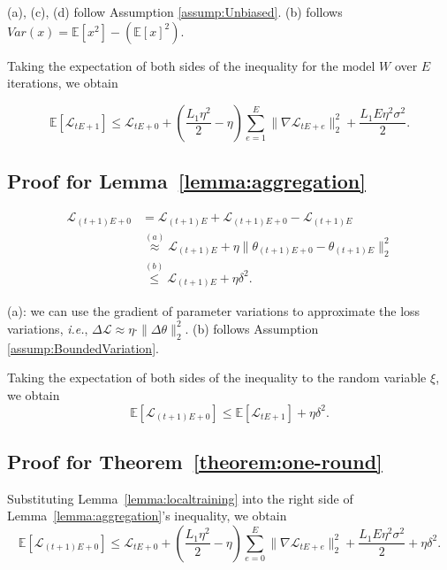 \documentclass[sigconf]{acmart}
\newcommand{\assum}{Assumption }
\begin{document}
(a), (c), (d) follow \assum \ref{assump:Unbiased}. (b) follows $Var(x)=\mathbb{E}[x^2]-(\mathbb{E}[x]^2)$. 


Taking the expectation of both sides of the inequality for the model $W$ over $E$ iterations, we obtain

\begin{equation}
\mathbb{E}[\mathcal{L}_{t E+1}] \leq \mathcal{L}_{t E+0}+(\frac{L_1 \eta^2}{2}-\eta) \sum_{e=1}^E\|\nabla \mathcal{L}_{t E+e}\|_2^2+\frac{L_1 E \eta^2 \sigma^2}{2} . 
\end{equation}

\subsection{Proof for Lemma~\ref{lemma:aggregation}}
\begin{equation}
\begin{aligned}
\mathcal{L}_{(t+1) E+0}& =\mathcal{L}_{(t+1) E}+\mathcal{L}_{(t+1) E+0}-\mathcal{L}_{(t+1) E} \\
& \stackrel{(a)}{\approx} \mathcal{L}_{(t+1) E}+\eta\|\theta_{(t+1) E+0}-\theta_{(t+1) E}\|_2^2 \\
& \stackrel{(b)}{\leq} \mathcal{L}_{(t+1) E}+\eta \delta^2.
\end{aligned}
\end{equation}

(a): we can use the gradient of parameter variations to approximate the loss variations, \emph{i.e.}, $\Delta\mathcal{L}\approx \eta\cdot \|\Delta \theta\|_2^2$. (b) follows \assum \ref{assump:BoundedVariation}.

Taking the expectation of both sides of the inequality to the random variable $\xi$, we obtain
\begin{equation}
    \mathbb{E}\left[\mathcal{L}_{(t+1)E+0}\right]\le\mathbb{E}\left[\mathcal{L}_{tE+1}\right]+{\eta\delta}^2.
\end{equation}


\subsection{Proof for Theorem~\ref{theorem:one-round}}
Substituting Lemma~\ref{lemma:localtraining} into the right side of Lemma~\ref{lemma:aggregation}'s inequality, we obtain
\begin{equation}\label{eq:theorem1}
\mathbb{E}[\mathcal{L}_{(t+1) E+0}] \leq \mathcal{L}_{t E+0}+(\frac{L_1 \eta^2}{2}-\eta) \sum_{e=0}^E\|\nabla \mathcal{L}_{t E+e}\|_2^2+\frac{L_1 E \eta^2 \sigma^2}{2}+\eta \delta^2.
\end{equation}
\end{document}
